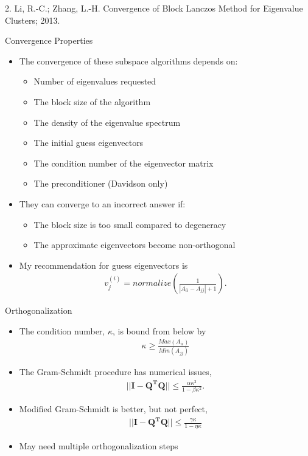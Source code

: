 \documentclass[10pt]{beamer}
\begin{document}
{{{{{{{{{{{{ 2. Li, R.-C.; Zhang, L.-H. Convergence of Block Lanczos Method for Eigenvalue Clusters; 2013.}
\begin{frame}{Convergence Properties}
	\begin{itemize}[<+->]
		\item{The convergence of these subspace algorithms depends on:}
		\begin{itemize}
			\item{\alert{Number of eigenvalues} requested}
			\item{The \alert{block size} of the algorithm}
			\item{The \alert{density} of the eigenvalue spectrum}
			\item{The \alert{initial guess} eigenvectors}
			\item{The \alert{condition number} of the eigenvector matrix}
			\item{The \alert{preconditioner} (Davidson only)}
		\end{itemize}
		\item{They can \alert{converge to an incorrect answer} if:}
		\begin{itemize}
			\item{The block size is too small compared to degeneracy}
			\item{The approximate eigenvectors become non-orthogonal}
		\end{itemize}
		\item{My recommendation for guess eigenvectors is
		\begin{eqnarray}
			v_j^{(i)} = normalize\left(\frac{1}{|A_{ii} - A_{jj}| + 1} \right).
		\end{eqnarray}
		}
	\end{itemize}
\end{frame}


{%
\begin{frame}{Orthogonalization}
	\begin{itemize}
		\item{The condition number, $\kappa$, is bound from below by
			\begin{eqnarray}
				\kappa \geq \frac{Max(A_{ii})}{Min(A_{jj})}
			\end{eqnarray}
		}
		\item{The Gram-Schmidt procedure has numerical issues, 
			\begin{eqnarray}
				||\mathbf{I} - \mathbf{Q^TQ}|| \leq \frac{\alpha\kappa^2}{1-\beta\kappa^2}.	
			\end{eqnarray}
		}
		\item{Modified Gram-Schmidt is better, but not perfect,
			\begin{eqnarray}
				||\mathbf{I} - \mathbf{Q^TQ}|| \leq \frac{\gamma\kappa}{1-\eta\kappa}	
			\end{eqnarray}
		}
		\item{May need multiple orthogonalization steps}
	\end{itemize}


\end{frame}}}}}}}}}}}}}
\end{document}
